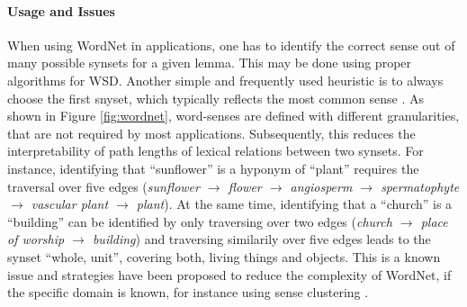 \paragraph*{Usage and Issues}
When using WordNet in applications, one has to identify the correct sense out of many possible synsets for a given lemma. This may be done using proper algorithms for \ac{WSD}. Another simple and frequently used heuristic is to always choose the first snyset, which typically reflects the most common sense \citep{mccarthy2004using}. As shown in Figure \ref{fig:wordnet}, word-senses are defined with different granularities, that are not required by most applications. Subsequently, this reduces the interpretability of path lengths of lexical relations between two synsets. For instance, identifying that ``sunflower'' is a hyponym of ``plant'' requires the traversal over five edges (\textit{sunflower $\rightarrow$ flower $\rightarrow$ angiosperm $\rightarrow$ spermatophyte $\rightarrow$ vascular plant $\rightarrow$ plant}). At the same time, identifying that a ``church'' is a ``building'' can be identified by only traversing over two edges (\textit{church $\rightarrow$ place of worship $\rightarrow$ building}) and traversing similarily over five edges leads to the synset ``whole, unit'', covering both, living things and objects. This is a known issue \citep{resnik1995using} and strategies have been proposed to reduce the complexity of WordNet, if the specific domain is known, for instance using sense clustering \citep{prakash2007learning}.

